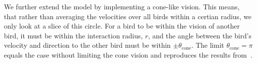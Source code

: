\documentclass[twoside,twocolumn]{article}
\begin{document}
We further extend the model by implementing a cone-like vision. This means, that 
rather than averaging the velocities over all birds within a certian radius, we 
only look at a slice of this circle. For a bird to be within the vision of 
another bird, it must be within the interaction radius, $r$, and the angle 
between the bird's velocity and direction to the other bird must be within $\pm \theta_{\text{cone}}$. The 
limit $\theta_{\text{cone}} = \pi$ equals the case without limiting the
cone vision and reproduces the results from~\cite{Vicsek}.

\begin{figure}[!htb]
	\centering

\end{figure}
\end{document}

